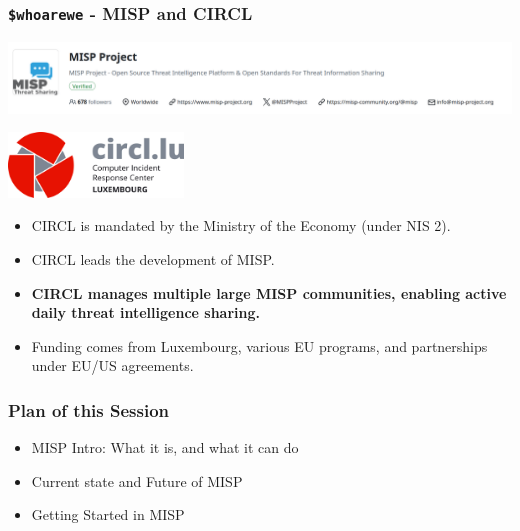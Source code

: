 
\begin{frame}[t,plain]
\titlepage
\end{frame}

\begin{frame}
    \frametitle{\texttt{\$whoarewe} - MISP and CIRCL}
    \begin{center}
        \includegraphics[width=1.0\textwidth]{misp-banner.png}
    \end{center}
    \begin{center}
        \includegraphics[width=0.35\textwidth]{circl.png}
    \end{center}
    \begin{itemize}
        \item CIRCL is mandated by the Ministry of the Economy (under NIS 2).
        \item CIRCL leads the development of MISP.
        \item {\bf CIRCL manages multiple large MISP communities, enabling active daily threat intelligence sharing.}
        \item Funding comes from Luxembourg, various EU programs, and partnerships under EU/US agreements.
    \end{itemize}
\end{frame}

\begin{frame}
    \frametitle{Plan of this Session}
    \begin{itemize}
        \item MISP Intro: What it is, and what it can do
        \item Current state and Future of MISP
        \item Getting Started in MISP
    \end{itemize}
\end{frame}

